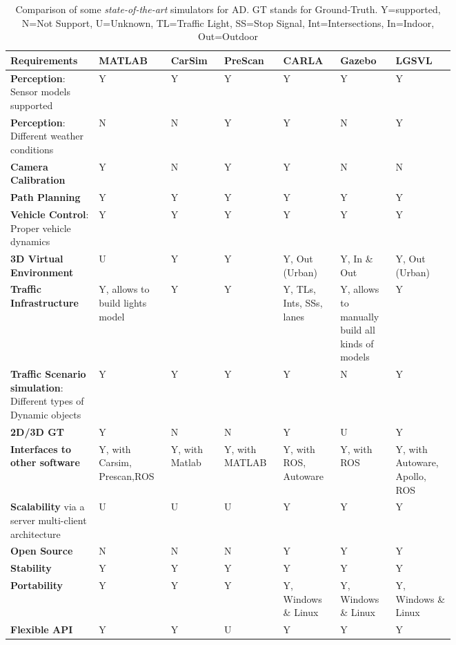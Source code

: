 \begin{table}[h]
	\caption[Comparison of some \textit{state-of-the-art} simulators for \ac{AD}]{Comparison of some \textit{state-of-the-art} simulators for \ac{AD}. GT stands for Ground-Truth. Y=supported, N=Not Support, U=Unknown, TL=Traffic Light, SS=Stop Signal, Int=Intersections, In=Indoor, Out=Outdoor}
	\label{table:2_simulators_ad_comparison}
	\centering
			\begin{tabular}{p{0.15\linewidth}||p{0.1\linewidth}|p{0.1\linewidth}|p{0.1\linewidth}|p{0.1\linewidth}|p{0.1\linewidth}|p{0.1\linewidth}}
				\toprule
				\textbf{Requirements} & \textbf{MATLAB} & \textbf{CarSim} & \textbf{PreScan} & \textbf{CARLA} & \textbf{Gazebo} & \textbf{LGSVL}\\
				\midrule
				\textbf{Perception}: Sensor models supported & Y & Y  & Y & Y & Y & Y \\
				\midrule
				\textbf{Perception}: Different weather conditions & N & N  & Y  & Y & N & Y \\
				\midrule
				\textbf{Camera Calibration} & Y & N  & Y & Y & N  & N \\
				\midrule
				\textbf{Path Planning} & Y & Y  & Y  & Y & Y & Y \\
				\midrule
				\textbf{Vehicle Control}: Proper vehicle dynamics & Y & Y  & Y  & Y & Y & Y \\
				\midrule
				\textbf{3D Virtual Environment} & U & Y  & Y  & Y, Out (Urban) & Y, In \& Out & Y, Out (Urban) \\
				\midrule
				\textbf{Traffic Infrastructure} & Y, allows to build lights model & Y  & Y & Y, TLs, Ints, SSs, lanes  & Y, allows to manually build all kinds of models & Y \\
				\midrule
				\textbf{Traffic Scenario simulation}: Different types of Dynamic objects & Y & Y & Y & Y & N & Y \\
				\midrule
				\textbf{2D/3D GT} & Y & N & N & Y & U & Y \\
				\midrule
				\textbf{Interfaces to other software} & Y,  with Carsim, Prescan,ROS & Y, with Matlab & Y, with MATLAB & Y, with ROS, Autoware & Y, with ROS & Y, with Autoware, Apollo, ROS \\
				\midrule
				\textbf{Scalability} via a server multi-client architecture & U & U & U & Y & Y & Y \\
				\midrule
				\textbf{Open Source} & N & N & N & Y & Y & Y \\
				\midrule
				\textbf{Stability} & Y & Y & Y & Y & Y & Y \\
				\midrule
				\textbf{Portability} & Y & Y & Y & Y, Windows \& Linux & Y, Windows \& Linux & Y, Windows \& Linux \\
				\midrule
				\textbf{Flexible API} & Y & Y & U & Y & Y & Y \\
				\bottomrule
			\end{tabular}%
\end{table}


